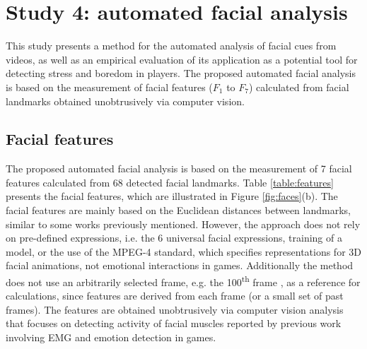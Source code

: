 \section{Study 4: automated facial analysis}
\label{sec:experiment1-study4}

This study presents a method for the automated analysis of facial cues from videos, as well as an empirical evaluation of its application as a potential tool for detecting stress and boredom in players. The proposed automated facial analysis is based on the measurement of facial features ($F_1$ to $F_7$) calculated from facial landmarks obtained unobtrusively via computer vision.


\subsection{Facial features}
\label{sec:experiment1-study4-features-extraction}

The proposed automated facial analysis is based on the measurement of 7 facial features calculated from 68 detected facial landmarks. Table \ref{table:features} presents the facial features, which are illustrated in Figure \ref{fig:faces}(b). The facial features are mainly based on the Euclidean distances between landmarks, similar to some works previously mentioned. However, the approach does not rely on pre-defined expressions, i.e. the 6 universal facial expressions, training of a model, or the use of the MPEG-4 standard, which specifies representations for 3D facial animations, not emotional interactions in games. Additionally the method does not use an arbitrarily selected frame, e.g. the 100\textsuperscript{th} frame \parencite{giannakakis2017stress}, as a reference for calculations, since features are derived from each frame (or a small set of past frames). The features are obtained unobtrusively via computer vision analysis that focuses on detecting activity of facial muscles reported by previous work involving EMG and emotion detection in games.

